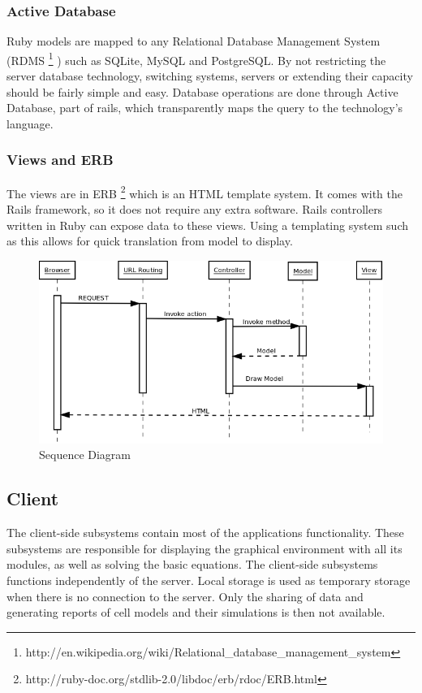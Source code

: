 \documentclass{report}
\begin{document}
				\subsubsection{Active Database}
					Ruby models are mapped to any Relational Database Management System (RDMS \footnote{http://en.wikipedia.org/wiki/Relational\_database\_management\_system} ) such as SQLite, MySQL and PostgreSQL. By not restricting the server database technology, switching systems, servers or extending their capacity should be fairly simple and easy. Database operations are done through Active Database, part of rails, which transparently maps the query to the technology's language.
				\subsubsection{Views and ERB} 
					The views are in ERB \footnote{http://ruby-doc.org/stdlib-2.0/libdoc/erb/rdoc/ERB.html} which is an HTML template system. It comes with the Rails framework, so it does not require any extra software. Rails controllers written in Ruby can expose data to these views. Using a templating system such as this allows for quick translation from model to display. 
			\clearpage
			\begin{figure}[htb]
				\begin{center}
				\includegraphics[scale=0.4]{SequenceDiagramLife.png}
				\caption{Sequence Diagram}
				\label{fig: SequenceDiagram}
				\end{center}
				\end{figure}	
			\clearpage

			\subsection{Client}
				The client-side subsystems contain most of the applications functionality. These subsystems are responsible for displaying the graphical environment with all its modules, as well as solving the basic equations.  The client-side subsystems functions independently of the server. Local storage is used as temporary storage when there is no connection to the server. Only the sharing of data and generating reports of cell models and their simulations is then not available.
\end{document}
